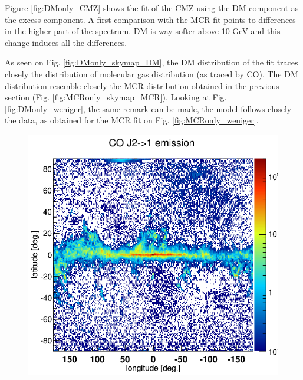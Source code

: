 Figure \ref{fig:DMonly_CMZ} shows the fit of the CMZ using the DM component as the excess component. A first comparison with the MCR fit points to differences in the higher part of the spectrum. DM is way softer above 10 GeV and this change induces all the differences.

As seen on Fig. \ref{fig:DMonly_skymap_DM}, the DM distribution of the fit traces closely the distribution of molecular gas distribution (as traced by CO). The DM distribution resemble closely the MCR distribution obtained in the previous section (Fig. \ref{fig:MCRonly_skymap_MCR}). Looking at Fig. \ref{fig:DMonly_weniger}, the same remark can be made, the model follows closely the data, as obtained for the MCR fit on Fig. \ref{fig:MCRonly_weniger}.


\newpage
\begin{figure}[H]
  \centering
  \begin{minipage}[h]{0.45\textwidth}
  	\centering
	\includegraphics[width=1.\linewidth]{pic/results/COmap.png}
  	\label{fig:CO_skymap}
  \end{minipage}
  \hfill
  \begin{minipage}[h]{0.45\textwidth}
  	\centering

\end{minipage}
\end{figure}
